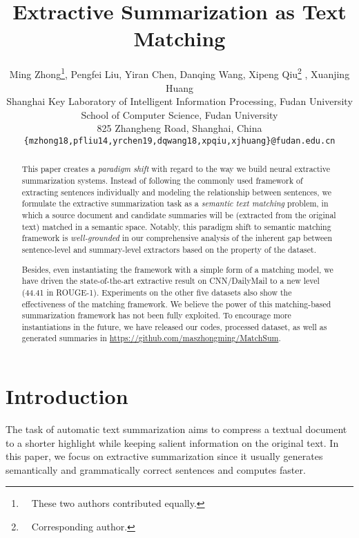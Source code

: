 \documentclass[11pt,a4paper]{article}
\title{Extractive Summarization as Text Matching}
\author{Ming Zhong\thanks{\ \  These two authors contributed equally.}, Pengfei Liu\samethanks, Yiran Chen, Danqing Wang, Xipeng Qiu\thanks{\ \  Corresponding author.} , Xuanjing Huang \\
  Shanghai Key Laboratory of Intelligent Information Processing, Fudan University \\
  School of Computer Science, Fudan University \\
  825 Zhangheng Road, Shanghai, China \\
  \texttt{\{mzhong18,pfliu14,yrchen19,dqwang18,xpqiu,xjhuang\}@fudan.edu.cn}
  }
\date{}
\begin{document}
\maketitle

\begin{abstract}






This paper creates a \emph{paradigm shift} with regard to the way we build neural extractive summarization systems. Instead of following the commonly used framework of extracting sentences individually and modeling the relationship between sentences, we formulate the extractive summarization task as a \emph{semantic text matching} problem, in which a source document and candidate summaries will be (extracted from the original text) matched in a semantic space. Notably, this paradigm shift to semantic matching framework is \emph{well-grounded} in our comprehensive analysis of the inherent gap between sentence-level and summary-level extractors based on the property of the dataset.

Besides, even instantiating the framework with a simple form of a matching model, we have driven the state-of-the-art extractive result on CNN/DailyMail to a new level (44.41 in ROUGE-1). Experiments on the other five datasets also show the effectiveness of the matching framework.  We believe the power of this matching-based summarization framework has not been fully exploited. To encourage more instantiations in the future,  we have released our codes, processed dataset, as well as generated summaries in {\url{https://github.com/maszhongming/MatchSum}}.


\end{abstract}


\section{Introduction}


The task of automatic text summarization aims to compress a textual document to a shorter highlight while keeping salient information on the original text.
In this paper, we focus on extractive summarization since it usually generates semantically and grammatically correct sentences \cite{dong2018banditsum,nallapati2017summarunner} and computes faster.
\end{document}
